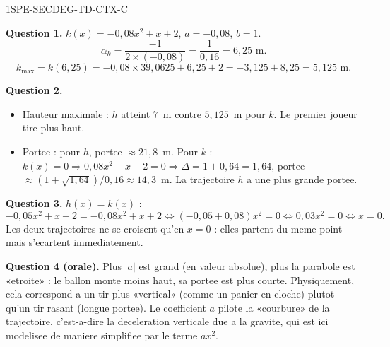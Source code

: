 \begin{corrige}{1SPE-SECDEG-TD-CTX-C}

\textbf{Question 1.} $k(x) = -0{,}08x^2 + x + 2$, $a = -0{,}08$, $b = 1$.
\[
\alpha_k = \frac{-1}{2 \times (-0{,}08)} = \frac{1}{0{,}16} = 6{,}25 \text{ m}.
\]
\[
k_{\max} = k(6{,}25) = -0{,}08 \times 39{,}0625 + 6{,}25 + 2 = -3{,}125 + 8{,}25 = 5{,}125 \text{ m}.
\]

\textbf{Question 2.}
\begin{itemize}
  \item Hauteur maximale : $h$ atteint $7$~m contre $5{,}125$~m pour $k$. Le premier joueur tire plus haut.
  \item Portee : pour $h$, portee $\approx 21{,}8$~m. Pour $k$ : $k(x) = 0 \Rightarrow 0{,}08x^2 - x - 2 = 0 \Rightarrow \Delta = 1 + 0{,}64 = 1{,}64$, portee $\approx (1 + \sqrt{1{,}64})/0{,}16 \approx 14{,}3$~m. La trajectoire $h$ a une plus grande portee.
\end{itemize}

\textbf{Question 3.} $h(x) = k(x)$ :
\[
-0{,}05x^2 + x + 2 = -0{,}08x^2 + x + 2
\Leftrightarrow (-0{,}05 + 0{,}08)x^2 = 0
\Leftrightarrow 0{,}03x^2 = 0
\Leftrightarrow x = 0.
\]
Les deux trajectoires ne se croisent qu'en $x = 0$ : elles partent du meme point mais s'ecartent immediatement.


\textbf{Question 4 (orale).} Plus $|a|$ est grand (en valeur absolue), plus la parabole est «etroite» : le ballon monte moins haut, sa portee est plus courte. Physiquement, cela correspond a un tir plus «vertical» (comme un panier en cloche) plutot qu'un tir rasant (longue portee). Le coefficient $a$ pilote la «courbure» de la trajectoire, c'est-a-dire la deceleration verticale due a la gravite, qui est ici modelisee de maniere simplifiee par le terme $ax^2$.

\end{corrige}
